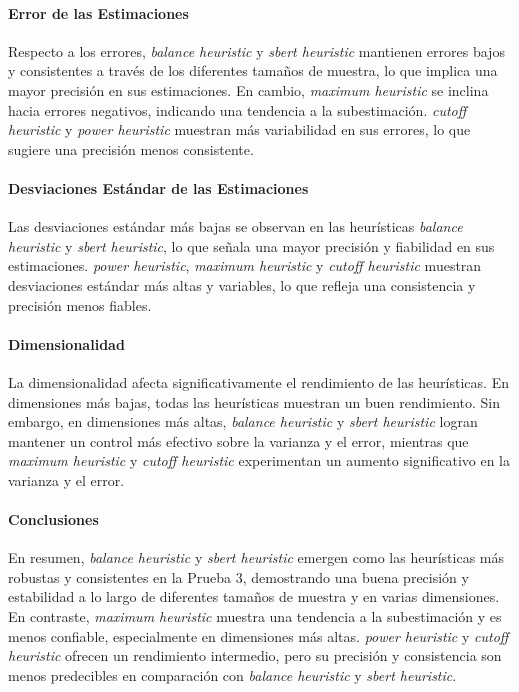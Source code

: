 \documentclass{article}
\begin{document}
\paragraph{Error de las Estimaciones}
Respecto a los errores, \textit{balance heuristic} y \textit{sbert heuristic} mantienen errores bajos y consistentes a través de los diferentes tamaños de muestra, lo que implica una mayor precisión en sus estimaciones. En cambio, \textit{maximum heuristic} se inclina hacia errores negativos, indicando una tendencia a la subestimación. \textit{cutoff heuristic} y \textit{power heuristic} muestran más variabilidad en sus errores, lo que sugiere una precisión menos consistente.

\paragraph{Desviaciones Estándar de las Estimaciones}
Las desviaciones estándar más bajas se observan en las heurísticas \textit{balance heuristic} y \textit{sbert heuristic}, lo que señala una mayor precisión y fiabilidad en sus estimaciones. \textit{power heuristic}, \textit{maximum heuristic} y \textit{cutoff heuristic} muestran desviaciones estándar más altas y variables, lo que refleja una consistencia y precisión menos fiables.

\paragraph{Dimensionalidad}
La dimensionalidad afecta significativamente el rendimiento de las heurísticas. En dimensiones más bajas, todas las heurísticas muestran un buen rendimiento. Sin embargo, en dimensiones más altas, \textit{balance heuristic} y \textit{sbert heuristic} logran mantener un control más efectivo sobre la varianza y el error, mientras que \textit{maximum heuristic} y \textit{cutoff heuristic} experimentan un aumento significativo en la varianza y el error.

\paragraph{Conclusiones}
En resumen, \textit{balance heuristic} y \textit{sbert heuristic} emergen como las heurísticas más robustas y consistentes en la Prueba 3, demostrando una buena precisión y estabilidad a lo largo de diferentes tamaños de muestra y en varias dimensiones. En contraste, \textit{maximum heuristic} muestra una tendencia a la subestimación y es menos confiable, especialmente en dimensiones más altas. \textit{power heuristic} y \textit{cutoff heuristic} ofrecen un rendimiento intermedio, pero su precisión y consistencia son menos predecibles en comparación con \textit{balance heuristic} y \textit{sbert heuristic}.
\end{document}
